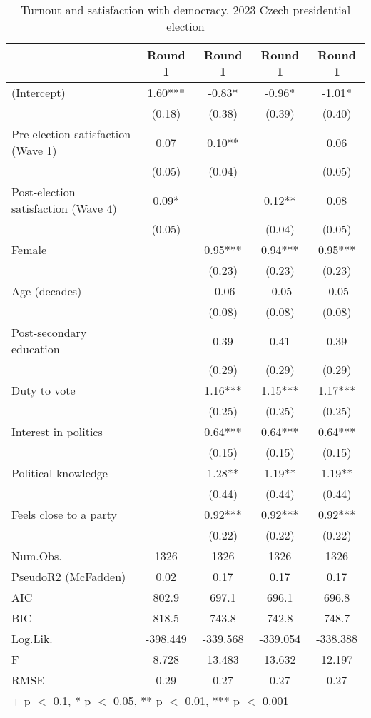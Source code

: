 \begin{table}

\caption{Turnout and satisfaction with democracy, 2023 Czech presidential election}
\centering
\begin{tabular}[t]{lcccc}
\toprule
  & Round 1 & Round 1  & Round 1   & Round 1   \\
\midrule
(Intercept) & 1.60*** & -0.83* & -0.96* & -1.01*\\
 & (0.18) & (0.38) & (0.39) & (0.40)\\
Pre-election satisfaction (Wave 1) & 0.07 & 0.10** &  & 0.06\\
 & (0.05) & (0.04) &  & (0.05)\\
Post-election satisfaction (Wave 4) & 0.09* &  & 0.12** & 0.08\\
 & (0.05) &  & (0.04) & (0.05)\\
Female &  & 0.95*** & 0.94*** & 0.95***\\
 &  & (0.23) & (0.23) & (0.23)\\
Age (decades) &  & -0.06 & -0.05 & -0.05\\
 &  & (0.08) & (0.08) & (0.08)\\
Post-secondary education &  & 0.39 & 0.41 & 0.39\\
 &  & (0.29) & (0.29) & (0.29)\\
Duty to vote &  & 1.16*** & 1.15*** & 1.17***\\
 &  & (0.25) & (0.25) & (0.25)\\
Interest in politics &  & 0.64*** & 0.64*** & 0.64***\\
 &  & (0.15) & (0.15) & (0.15)\\
Political knowledge &  & 1.28** & 1.19** & 1.19**\\
 &  & (0.44) & (0.44) & (0.44)\\
Feels close to a party &  & 0.92*** & 0.92*** & 0.92***\\
 &  & (0.22) & (0.22) & (0.22)\\
\midrule
Num.Obs. & 1326 & 1326 & 1326 & 1326\\
PseudoR2 (McFadden) & 0.02 & 0.17 & 0.17 & 0.17\\
AIC & 802.9 & 697.1 & 696.1 & 696.8\\
BIC & 818.5 & 743.8 & 742.8 & 748.7\\
Log.Lik. & -398.449 & -339.568 & -339.054 & -338.388\\
F & 8.728 & 13.483 & 13.632 & 12.197\\
RMSE & 0.29 & 0.27 & 0.27 & 0.27\\
\bottomrule
\multicolumn{5}{l}{\rule{0pt}{1em}+ p $<$ 0.1, * p $<$ 0.05, ** p $<$ 0.01, *** p $<$ 0.001}\\
\end{tabular}
\end{table}
